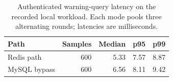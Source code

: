 \begin{table}[htbp]
\centering\small
\caption{Authenticated warning-query latency on the recorded local workload. Each mode pools three alternating rounds; latencies are milliseconds.}
\label{tab:latency}
\begin{tabular}{lrrrr}\toprule
Path & Samples & Median & p95 & p99 \\\midrule
Redis path & 600 & 5.33 & 7.57 & 8.87 \\
MySQL bypass & 600 & 6.56 & 8.11 & 9.42 \\
\bottomrule\end{tabular}
\end{table}
